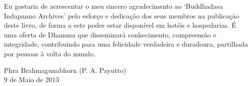 {Eu gostaria de acrescentar o meu sincero agradecimento ao ‘Buddhadasa Indapanno
Archives’ pelo esforço e dedicação dos seus membros na publicação deste livro,
de forma a este poder estar disponível em hotéis e hospedarias. É uma oferta de
Dhamma que disseminará conhecimento, compreensão e integridade, contribuindo
para uma felicidade verdadeira e duradoura, partilhada por pessoas à volta do
mundo.

\bigskip

{\raggedleft
  Phra Brahmagunabhorn (P. A. Payutto)\\
  9 de Maio de 2013
\par}

}

